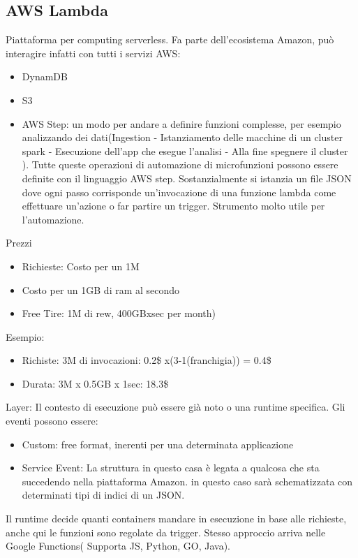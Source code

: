 \documentclass{article}
\begin{document}
		\subsection{AWS Lambda}
		Piattaforma per computing serverless. Fa parte dell'ecosistema Amazon, può interagire infatti con tutti i servizi AWS:
		\begin{itemize}
		    \item DynamDB
		    \item S3
		    \item AWS Step: un modo per andare a definire funzioni complesse, per esempio analizzando dei dati(Ingestion - Istanziamento delle macchine di un cluster spark - Esecuzione dell'app che esegue l'analisi - Alla fine spegnere il cluster ). Tutte queste operazioni di automazione di microfunzioni possono essere definite con il linguaggio AWS step. Sostanzialmente si istanzia un file JSON dove ogni passo corrisponde un'invocazione di una funzione lambda come effettuare un'azione o far partire un trigger. Strumento molto utile per l'automazione.
		\end{itemize}
		Prezzi
		\begin{itemize}
		    \item Richieste: Costo per un 1M
		    \item Costo per un 1GB di ram al secondo
		    \item Free Tire: 1M di rew, 400GBxsec per month)
		\end{itemize}
		Esempio:
		\begin{itemize}
		    \item Richiste: 3M di invocazioni: 0.2\$ x(3-1(franchigia)) = 0.4\$
		    \item Durata: 3M x 0.5GB x 1sec: 18.3\$
		\end{itemize}
		Layer:
		Il contesto di esecuzione può essere già noto o una runtime specifica.
		Gli eventi possono essere:
		\begin{itemize}
		    \item Custom: free format, inerenti per una determinata applicazione
		    \item Service Event: La struttura in questo casa è legata a qualcosa che sta succedendo nella piattaforma Amazon. in questo caso sarà schematizzata con determinati tipi di indici di un JSON.
		\end{itemize}
		Il runtime decide quanti containers mandare in esecuzione in base alle richieste, anche qui le funzioni sono regolate da trigger. Stesso approccio arriva nelle Google Functions( Supporta JS, Python, GO, Java).
		
\end{document}
